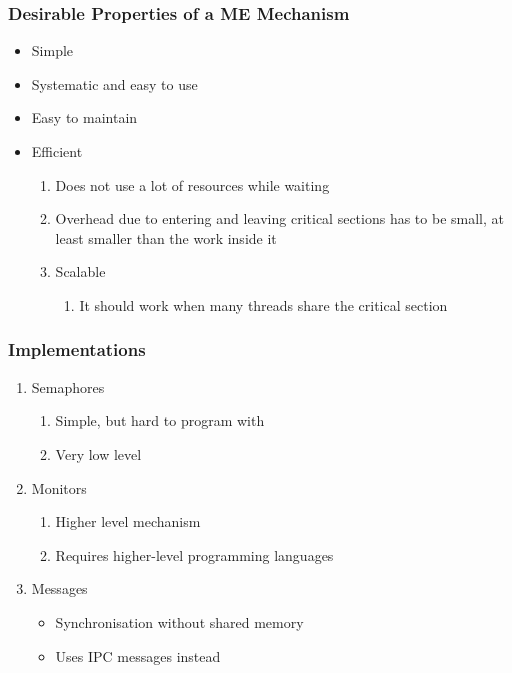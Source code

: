 \documentclass[11pt]{article}
\theoremstyle{definition}
\begin{document}
        \subsubsection{Desirable Properties of a ME Mechanism}
        \begin{itemize}
            \item Simple
            \item Systematic and easy to use
            \item Easy to maintain
            \item Efficient
            \begin{enumerate}
                \item Does not use a lot of resources while waiting
                \item Overhead due to entering and leaving critical sections has to be small, at least smaller than the work inside it
                \item Scalable
                \begin{enumerate}
                    \item It should work when many threads share the critical section
                \end{enumerate}
            \end{enumerate}
        \end{itemize}
        \subsubsection{Implementations}
        \begin{enumerate}
            \item Semaphores
            \begin{enumerate}
                \item Simple, but hard to program with
                \item Very low level
            \end{enumerate}
            \item Monitors
            \begin{enumerate}
                \item Higher level mechanism
                \item Requires higher-level programming languages
            \end{enumerate}
            \item Messages
            \begin{itemize}
                \item Synchronisation without shared memory
                \item Uses IPC messages instead
            \end{itemize}
        \end{enumerate}
\end{document}
